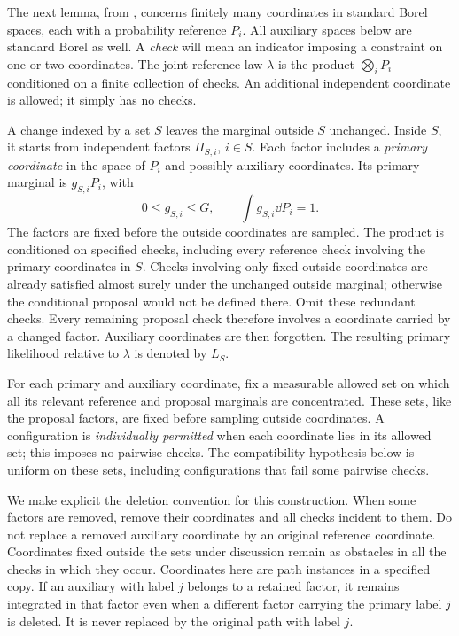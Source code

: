 The next lemma, from \citet[Lemma~8.3]{HS}, concerns finitely many
coordinates in standard Borel spaces,
each with a probability reference $P_i$. All auxiliary spaces below are
standard Borel as well. A \emph{check} will mean an indicator imposing a constraint
on one or two coordinates. The joint reference law $\lambda$ is the product
$\bigotimes_iP_i$ conditioned on a finite collection of checks. An additional
independent coordinate is allowed; it simply has no checks.

A change indexed by a set $S$ leaves the marginal outside $S$ unchanged.
Inside $S$, it starts from independent factors $\Pi_{S,i}$, $i\in S$.
Each factor includes a \emph{primary coordinate} in the space of $P_i$ and
possibly auxiliary coordinates. Its primary marginal is $g_{S,i}P_i$, with
\begin{equation}\label{cmp:factor-density}
 0\le g_{S,i}\le G,
 \qquad \int g_{S,i}\dd P_i=1.
\end{equation}
The factors are fixed before the outside coordinates are sampled. The product
is conditioned on specified checks, including every reference check involving
the primary coordinates in $S$. Checks involving only fixed outside
coordinates are already satisfied almost surely under the unchanged outside
marginal; otherwise the conditional proposal would not be defined there.
Omit these redundant checks. Every remaining proposal check therefore
involves a coordinate carried by a changed factor. Auxiliary coordinates
are then forgotten.
The resulting primary likelihood relative to $\lambda$ is denoted by $L_S$.

For each primary and auxiliary coordinate, fix a measurable allowed set
on which all its relevant reference and proposal marginals are
concentrated. These sets, like the proposal factors, are fixed before
sampling outside coordinates. A configuration is \emph{individually
permitted} when each coordinate lies in its allowed set; this imposes no
pairwise checks. The compatibility hypothesis below is uniform on these
sets, including configurations that fail some pairwise checks.

We make explicit the deletion convention for this construction. When some
factors are removed, remove their coordinates and all checks incident to them.
Do not replace a removed auxiliary coordinate by an original reference
coordinate. Coordinates fixed outside the sets under discussion remain as
obstacles in all the checks in which they occur. Coordinates here are path
instances in a specified copy. If an auxiliary with label $j$ belongs to a
retained factor, it remains integrated in that factor even when a different
factor carrying the primary label $j$ is deleted. It is never replaced by
the original path with label $j$.

